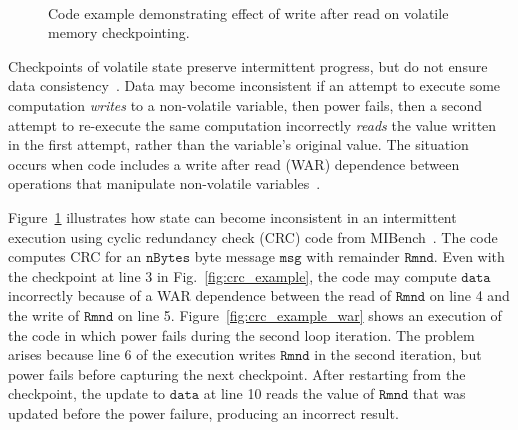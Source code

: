 \begin{figure}
	\centering
	\\
	\caption{Code example demonstrating effect of write after read on volatile memory checkpointing.}
	\label{fig:code_demo_incosistency}
\end{figure}

Checkpoints of volatile state preserve intermittent progress, but do not ensure data consistency~\cite{dino,chain,ratchet}. Data may become inconsistent if an attempt to execute some computation {\em writes} to a non-volatile variable, then power fails, then a second attempt to re-execute the same computation incorrectly {\em reads} the value written in the first attempt, rather than the variable's original value.  The situation occurs when code includes a write after read (WAR) dependence between operations that manipulate non-volatile variables~\cite{ratchet,dino,alpaca}.

Figure~\ref{fig:code_demo_incosistency} illustrates how state can become inconsistent in an intermittent execution using cyclic redundancy check (CRC) code from MIBench~\cite{hicks_mibench2_2016}. The code computes CRC for an $\texttt{nBytes}$ byte message $\texttt{msg}$ with remainder $\texttt{Rmnd}$. Even with the checkpoint at line 3 in Fig.~\ref{fig:crc_example}, the code may compute  $\texttt{data}$ incorrectly because of a WAR dependence between the read of $\texttt{Rmnd}$ on line 4 and the write of $\texttt{Rmnd}$ on line 5. Figure~\ref{fig:crc_example_war} shows an execution of the code in which power fails during the second loop iteration. The problem arises because line 6 of the execution writes $\texttt{Rmnd}$ in the second iteration, but power fails before capturing the next checkpoint. After restarting from the checkpoint, the update to $\texttt{data}$ at line 10 reads the value of $\texttt{Rmnd}$ that was updated before the power failure, producing an incorrect result.

